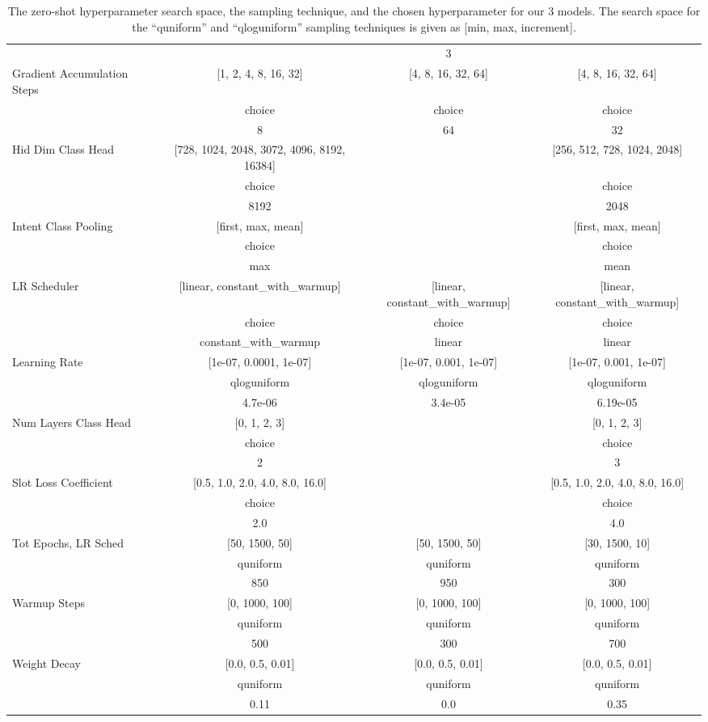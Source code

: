 \documentclass[11pt]{article}
\begin{document}
\begin{table*}[]
{\begin{tabular}{lccc}
  &  & 3 &  \\ 
Gradient Accumulation Steps  & [1, 2, 4, 8, 16, 32] & [4, 8, 16, 32, 64] & [4, 8, 16, 32, 64]\\ 
  & choice & choice & choice  \\ 
  & 8 & 64 & 32 \\ 
Hid Dim Class Head  & [728, 1024, 2048, 3072, 4096, 8192, 16384] &  & [256, 512, 728, 1024, 2048] \\ 
  & choice &  & choice \\ 
  & 8192 &  & 2048 \\ 
Intent Class Pooling  & [first, max, mean] &  & [first, max, mean] \\ 
  & choice &  & choice \\ 
  & max &  & mean \\ 
LR Scheduler  & [linear, constant\_with\_warmup] & [linear, constant\_with\_warmup] & [linear, constant\_with\_warmup] \\ 
  & choice & choice & choice \\ 
  & constant\_with\_warmup & linear & linear \\ 
Learning Rate  & [1e-07, 0.0001, 1e-07] & [1e-07, 0.001, 1e-07] & [1e-07, 0.001, 1e-07] \\ 
  & qloguniform & qloguniform & qloguniform \\ 
  & 4.7e-06 & 3.4e-05 & 6.19e-05 \\ 
Num Layers Class Head  & [0, 1, 2, 3] &  & [0, 1, 2, 3] \\ 
  & choice &  & choice \\ 
  & 2 &  & 3 \\ 
Slot Loss Coefficient  & [0.5, 1.0, 2.0, 4.0, 8.0, 16.0] &  & [0.5, 1.0, 2.0, 4.0, 8.0, 16.0] \\ 
  & choice &  & choice \\ 
  & 2.0 &  & 4.0 \\ 
Tot Epochs, LR Sched  & [50, 1500, 50] & [50, 1500, 50] & [30, 1500, 10] \\ 
  & quniform & quniform & quniform \\ 
  & 850 & 950 & 300 \\ 
Warmup Steps  & [0, 1000, 100] & [0, 1000, 100] & [0, 1000, 100] \\ 
  & quniform & quniform & quniform \\ 
  & 500 & 300 & 700 \\ 
Weight Decay  & [0.0, 0.5, 0.01] & [0.0, 0.5, 0.01] & [0.0, 0.5, 0.01] \\ 
  & quniform & quniform & quniform \\ 
  & 0.11 & 0.0  & 0.35 \\ 
\bottomrule
\end{tabular}
}
\caption{The zero-shot hyperparameter search space, the sampling technique, and the chosen hyperparameter for our 3 models. The search space for the ``quniform'' and ``qloguniform'' sampling techniques is given as [min, max, increment].}
\label{tab:model_hyperparams_zero}
\end{table*}
\end{document}
